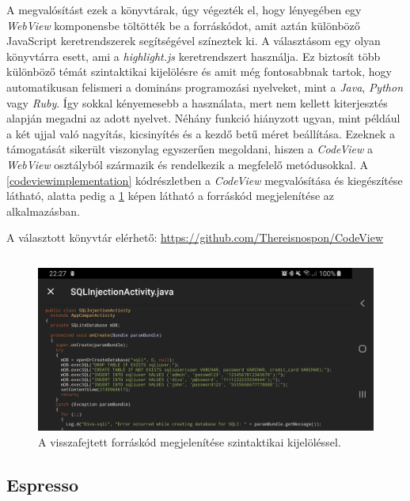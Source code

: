 \documentclass{thesis-ekf}
\theoremstyle{definition}
\theoremstyle{remark}
\begin{document}
A megvalósítást ezek a könyvtárak, úgy végezték el, hogy lényegében egy \emph{WebView} komponensbe töltötték be a forráskódot, amit aztán különböző JavaScript keretrendszerek segítségével színeztek ki.
A választásom egy olyan könyvtárra esett, ami a \emph{highlight.js} keretrendszert használja.
Ez biztosít több különböző témát szintaktikai kijelölésre és amit még fontosabbnak tartok, hogy automatikusan felismeri a domináns programozási nyelveket, mint a \emph{Java}, \emph{Python} vagy \emph{Ruby}.
Így sokkal kényemesebb a használata, mert nem kellett kiterjesztés alapján megadni az adott nyelvet.
Néhány funkció hiányzott ugyan, mint például a két ujjal való nagyítás, kicsinyítés és a kezdő betű méret beállítása.
Ezeknek a támogatását sikerült viszonylag egyszerűen megoldani, hiszen a \emph{CodeView} a \emph{WebView} osztályból származik és rendelkezik a megfelelő metódusokkal.
A \ref{codeviewimplementation} kódrészletben a \emph{CodeView} megvalósítása és kiegészítése látható, alatta pedig a \ref{codeview} képen látható a forráskód megjelenítése az alkalmazásban.

A választott könyvtár elérhető: \url{https://github.com/Thereisnospon/CodeView}

\inputminted[linenos=true, breaklines]{java}{./codes/codeview.java}

\begin{figure}[!h]
	\centering
	\includegraphics[width=15cm]{pictures/codeview}
	\caption{A visszafejtett forráskód megjelenítése szintaktikai kijelöléssel.}
	\label{codeview}
\end{figure}

\newpage

\subsection{Espresso}
\end{document}
